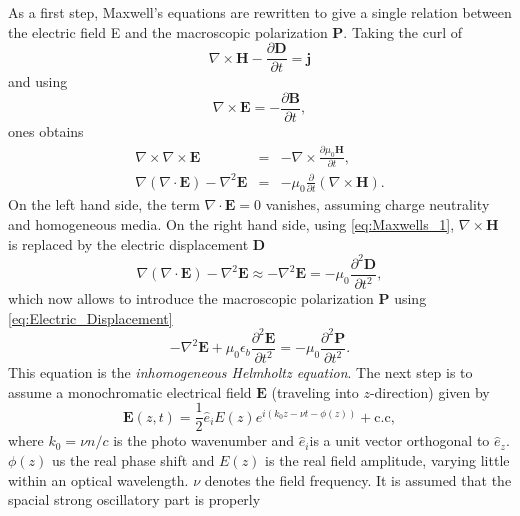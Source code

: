 As a first step, Maxwell\textquoteright{}s equations are rewritten
to give a single relation between the electric field E and the macroscopic
polarization $\mathbf{P}$. Taking the curl of\begin{equation}
\nabla\times\mathbf{H}-\frac{\partial\mathbf{D}}{\partial t}=\mathbf{j}\label{eq:Maxwells_1}\end{equation}
and using \begin{equation}
\nabla\times\mathbf{E}=-\frac{\partial\mathbf{B}}{\partial t},\label{eq:Maxwells_2}\end{equation}
ones obtains\begin{eqnarray}
\nabla\times\nabla\times\mathbf{E} & = & -\nabla\times\frac{\partial\mu_{0}\mathbf{H}}{\partial t},\\
\nabla\left(\nabla\cdot\mathbf{E}\right)-\nabla^{2}\mathbf{E} & = & -\mu_{0}\frac{\partial}{\partial t}\left(\nabla\times\mathbf{H}\right).\end{eqnarray}
On the left hand side, the term $\nabla\cdot\mathbf{E}=0$ vanishes,
assuming charge neutrality and homogeneous media. On the right hand
side, using \ref{eq:Maxwells_1}, $\nabla\times\mathbf{H}$ is replaced
by the electric displacement $\mathbf{D}$\begin{equation}
\nabla\left(\nabla\cdot\mathbf{E}\right)-\nabla^{2}\mathbf{E}\approx-\nabla^{2}\mathbf{E}=-\mu_{0}\frac{\partial^{2}\mathbf{D}}{\partial t^{2}},\end{equation}
which now allows to introduce the macroscopic polarization $\mathbf{P}$
using \ref{eq:Electric_Displacement}\begin{equation}
-\nabla^{2}\mathbf{E}+\mu_{0}\epsilon_{b}\frac{\partial^{2}\mathbf{E}}{\partial t^{2}}=-\mu_{0}\frac{\partial^{2}\mathbf{P}}{\partial t^{2}}.\label{eq:Helmholtz_Eq}\end{equation}
This equation is the\emph{ inhomogeneous Helmholtz equation}. The
next step is to assume a monochromatic electrical field $\mathbf{E}$
(traveling into $z$-direction) given by\begin{equation}
\mathbf{E}(z,t)=\frac{1}{2}\hat{e}_{i}E(z)e^{i\left(k_{0}z-\nu t-\phi(z)\right)}+\mbox{c.c},\label{eq:Electrical_Field_Ansatz}\end{equation}
where $k_{0}=\nu n/c$ is the photo wavenumber and $\hat{e}_{i}$is
a unit vector orthogonal to $\hat{e}_{z}$. $\phi(z)$ us the real
phase shift and $E(z)$ is the real field amplitude, varying little
within an optical wavelength. $\nu$ denotes the field frequency.
It is assumed that the spacial strong oscillatory part is properly
